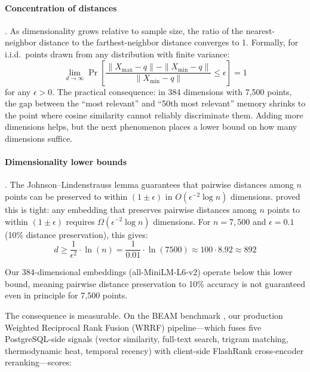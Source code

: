 \documentclass[11pt]{article}
\begin{document}
\paragraph{Concentration of distances} \citep{Beyer1999}.
As dimensionality grows relative to sample size, the ratio of the
nearest-neighbor distance to the farthest-neighbor distance converges
to 1.  Formally, for i.i.d.\ points drawn from any distribution with
finite variance:
\begin{equation}
\lim_{d \to \infty} \Pr\!\left[\frac{\|X_{\max} - q\| - \|X_{\min} - q\|}{\|X_{\min} - q\|} \leq \epsilon\right] = 1
\label{eq:concentration}
\end{equation}
for any $\epsilon > 0$.  The practical consequence: in 384 dimensions
with 7,500 points, the gap between the ``most relevant'' and ``50th
most relevant'' memory shrinks to the point where cosine similarity
cannot reliably discriminate them.  Adding more dimensions helps, but
the next phenomenon places a lower bound on how many dimensions suffice.

\paragraph{Dimensionality lower bounds} \citep{Larsen2017}.
The Johnson--Lindenstrauss lemma guarantees that pairwise distances
among $n$ points can be preserved to within $(1 \pm \epsilon)$ in
$O(\epsilon^{-2} \log n)$ dimensions.  \citet{Larsen2017} proved
this is tight: any embedding that preserves pairwise distances among
$n$ points to within $(1 \pm \epsilon)$ requires
$\Omega(\epsilon^{-2} \log n)$ dimensions.  For $n = 7{,}500$ and
$\epsilon = 0.1$ (10\% distance preservation), this gives:
\begin{equation}
d \geq \frac{1}{\epsilon^2} \cdot \ln(n) = \frac{1}{0.01} \cdot \ln(7500) \approx 100 \cdot 8.92 \approx 892
\label{eq:jl-bound}
\end{equation}

Our 384-dimensional embeddings (all-MiniLM-L6-v2) operate below
this lower bound, meaning pairwise distance preservation to 10\%
accuracy is not guaranteed even in principle for 7,500 points.

The consequence is measurable.  On the BEAM benchmark
\citep{Tavakoli2026}, our production Weighted Reciprocal Rank Fusion
(WRRF) pipeline---which fuses five PostgreSQL-side signals (vector
similarity, full-text search, trigram matching, thermodynamic heat,
temporal recency) with client-side FlashRank cross-encoder reranking---scores:
\end{document}
